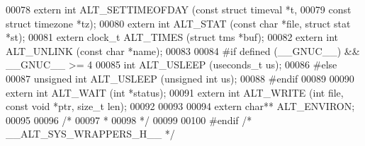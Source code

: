\begin{DoxyCode}
00078 \textcolor{keyword}{extern} \textcolor{keywordtype}{int}     ALT_SETTIMEOFDAY (\textcolor{keyword}{const} \textcolor{keyword}{struct} timeval  *t,
00079                                  \textcolor{keyword}{const} \textcolor{keyword}{struct} timezone *tz);
00080 \textcolor{keyword}{extern} \textcolor{keywordtype}{int}     ALT_STAT (\textcolor{keyword}{const} \textcolor{keywordtype}{char} *file, \textcolor{keyword}{struct} stat *st);
00081 \textcolor{keyword}{extern} clock\_t ALT_TIMES (\textcolor{keyword}{struct} tms *buf);
00082 \textcolor{keyword}{extern} \textcolor{keywordtype}{int}     ALT_UNLINK (\textcolor{keyword}{const} \textcolor{keywordtype}{char} *name);
00083 
00084 \textcolor{preprocessor}{#if defined (\_\_GNUC\_\_) && \_\_GNUC\_\_ >= 4}
00085 \textcolor{keywordtype}{int} ALT_USLEEP (useconds\_t us);
00086 \textcolor{preprocessor}{#else}
00087 \textcolor{keywordtype}{unsigned} \textcolor{keywordtype}{int}   ALT_USLEEP (\textcolor{keywordtype}{unsigned} \textcolor{keywordtype}{int} us);
00088 \textcolor{preprocessor}{#endif}
00089 
00090 \textcolor{keyword}{extern} \textcolor{keywordtype}{int}     ALT_WAIT (\textcolor{keywordtype}{int} *status);
00091 \textcolor{keyword}{extern} \textcolor{keywordtype}{int}     ALT_WRITE (\textcolor{keywordtype}{int} file, \textcolor{keyword}{const} \textcolor{keywordtype}{void} *ptr, \textcolor{keywordtype}{size\_t} len);
00092 
00093 
00094 \textcolor{keyword}{extern} \textcolor{keywordtype}{char}** ALT_ENVIRON;
00095 
00096 \textcolor{comment}{/*}
00097 \textcolor{comment}{ *}
00098 \textcolor{comment}{ */}
00099 
00100 \textcolor{preprocessor}{#endif }\textcolor{comment}{/* \_\_ALT\_SYS\_WRAPPERS\_H\_\_ */}\textcolor{preprocessor}{}
\end{DoxyCode}
